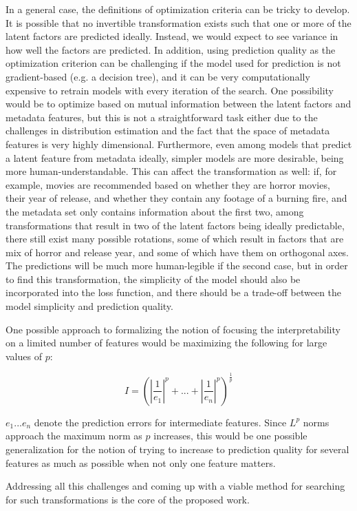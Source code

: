 In a general case, the definitions of optimization criteria can be tricky
to develop. It is possible that no invertible transformation exists such that
one or more of the latent factors are predicted ideally. Instead, we would
expect to see variance in how well the factors are predicted. In addition, using
prediction quality as the optimization criterion can be challenging if the
model used for prediction is not gradient-based (e.g. a decision tree), and it
can be very computationally expensive to retrain models with every iteration of
the search. One possibility would be to optimize based on mutual information
between the latent factors and metadata features, but this is not a
straightforward task either due to the challenges in distribution estimation and
the fact that the space of metadata features is very highly dimensional.
Furthermore, even among models that predict a latent feature from metadata
ideally, simpler models are more desirable, being more human-understandable.
This can affect the transformation as well: if, for example, movies are
recommended based on whether they are horror movies, their year of release, and
whether they contain any footage of a burning fire, and the metadata set only
contains information about the first two, among transformations that result in
two of the latent factors being ideally predictable, there still exist many
possible rotations, some of which result in factors that are mix of horror and
release year, and some of which have them on orthogonal axes. The predictions
will be much more human-legible if the second case, but in order to find this
transformation, the simplicity of the model should also be incorporated into the
loss function, and there should be a trade-off between the model simplicity and
prediction quality.

One possible approach to formalizing the notion of focusing the interpretability
on a limited number of features would be maximizing the following for large
values of $p$:

\begin{equation}
I = (|\frac{1}{e_1}|^p + ... + |\frac{1}{e_n}|^p)^{\frac{1}{p}}
\end{equation}

$e_1 ... e_n$ denote the prediction errors for intermediate features. Since $L^p$
norms approach the maximum norm as $p$ increases, this would be one possible
generalization for the notion of trying to increase to prediction quality for
several features as much as possible when not only one feature matters.

Addressing all this challenges and coming up with a viable method for searching
for such transformations is the core of the proposed work.
